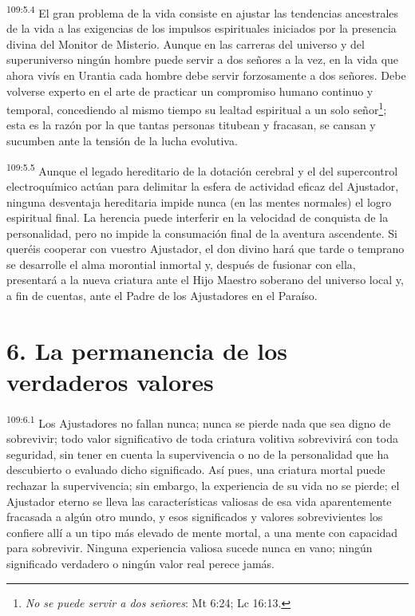 \par
\textsuperscript{109:5.4} El gran problema de la vida consiste en ajustar las tendencias ancestrales de la vida a las exigencias de los impulsos espirituales iniciados por la presencia divina del Monitor de Misterio. Aunque en las carreras del universo y del superuniverso ningún hombre puede servir a dos señores a la vez, en la vida que ahora vivís en Urantia cada hombre debe servir forzosamente a dos señores. Debe volverse experto en el arte de practicar un compromiso humano continuo y temporal, concediendo al mismo tiempo su lealtad espiritual a un solo señor\footnote{\textit{No se puede servir a dos señores}: Mt 6:24; Lc 16:13.}; esta es la razón por la que tantas personas titubean y fracasan, se cansan y sucumben ante la tensión de la lucha evolutiva.

\par
\textsuperscript{109:5.5} Aunque el legado hereditario de la dotación cerebral y el del supercontrol electroquímico actúan para delimitar la esfera de actividad eficaz del Ajustador, ninguna desventaja hereditaria impide nunca (en las mentes normales) el logro espiritual final. La herencia puede interferir en la velocidad de conquista de la personalidad, pero no impide la consumación final de la aventura ascendente. Si queréis cooperar con vuestro Ajustador, el don divino hará que tarde o temprano se desarrolle el alma morontial inmortal y, después de fusionar con ella, presentará a la nueva criatura ante el Hijo Maestro soberano del universo local y, a fin de cuentas, ante el Padre de los Ajustadores en el Paraíso.

\section*{6. La permanencia de los verdaderos valores}
\par
\textsuperscript{109:6.1} Los Ajustadores no fallan nunca; nunca se pierde nada que sea digno de sobrevivir; todo valor significativo de toda criatura volitiva sobrevivirá con toda seguridad, sin tener en cuenta la supervivencia o no de la personalidad que ha descubierto o evaluado dicho significado. Así pues, una criatura mortal puede rechazar la supervivencia; sin embargo, la experiencia de su vida no se pierde; el Ajustador eterno se lleva las características valiosas de esa vida aparentemente fracasada a algún otro mundo, y esos significados y valores sobrevivientes los confiere allí a un tipo más elevado de mente mortal, a una mente con capacidad para sobrevivir. Ninguna experiencia valiosa sucede nunca en vano; ningún significado verdadero o ningún valor real perece jamás.

